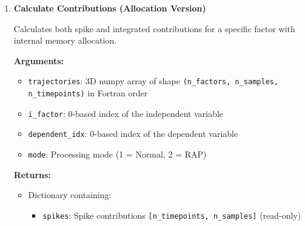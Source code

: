 \begin{enumerate}
\begin{itemize}
            \item \texttt{dependent}: 1D numpy array of shape \texttt{(n\_timepoints,)}
                  — dependent variable
                  
            \item \texttt{mode}: Processing mode (1 = Normal, 2 = RAP)
          \end{itemize}
          \textbf{Returns:}
          \begin{itemize}
            \item \texttt{contribution}: 1D numpy array of shape \texttt{(n\_timepoints,)}
                  with contribution values per timepoint (read-only)
          \end{itemize}
          \begin{lstlisting}[language=Python, caption={Spike-Wise Contribution Calculation}]
spike_contributions = tox_spike_contribution(factor, dependent, mode)
          \end{lstlisting}
          
    \item \textbf{Calculate Contributions (Allocation Version)}
          
          Calculates both spike and integrated contributions for a specific factor with
          internal memory allocation.
          
          \textbf{Arguments:}
          \begin{itemize}
            \item \texttt{trajectories}: 3D numpy array of shape \texttt{(n\_factors,
                  n\_samples, n\_timepoints)} in Fortran order
            
            \item \texttt{i\_factor}: 0-based index of the independent variable
                  
            \item \texttt{dependent\_idx}: 0-based index of the dependent variable
                  
            \item \texttt{mode}: Processing mode (1 = Normal, 2 = RAP)
          \end{itemize}
          \textbf{Returns:}
          \begin{itemize}
            \item Dictionary containing:
                  \begin{itemize}
                    \item \texttt{spikes}: Spike contributions \texttt{[n\_timepoints, n\_samples]}
                          (read-only)
                          

\end{itemize}
\end{itemize}
\end{enumerate}

